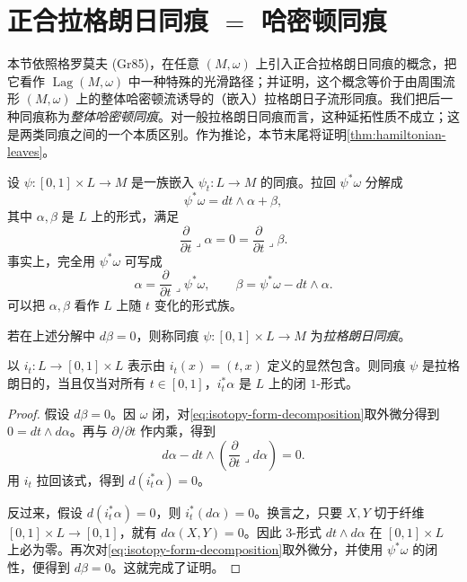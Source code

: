 \section{正合拉格朗日同痕 \texorpdfstring{$=$}{=} 哈密顿同痕}
\label{sec:exact-isotopy-hamiltonian-isotopy}

本节依照格罗莫夫 (Gr85)，在任意 $(M,\omega)$ 上引入正合拉格朗日同痕的概念，把它看作 $\operatorname{Lag}(M,\omega)$ 中一种特殊的光滑路径；并证明，这个概念等价于由周围流形 $(M,\omega)$ 上的整体哈密顿流诱导的（嵌入）拉格朗日子流形同痕。我们把后一种同痕称为\emph{整体哈密顿同痕}。对一般拉格朗日同痕而言，这种延拓性质不成立；这是两类同痕之间的一个本质区别。作为推论，本节末尾将证明\cref{thm:hamiltonian-leaves}。

设 $\psi:[0,1]\times L\to M$ 是一族嵌入 $\psi_t:L\to M$ 的同痕。拉回 $\psi^*\omega$ 分解成
\begin{equation}
 \psi^*\omega=dt\wedge\alpha+\beta,
 \label{eq:isotopy-form-decomposition}
\end{equation}
其中 $\alpha,\beta$ 是 $L$ 上的形式，满足
\[
 \frac\partial{\partial t}\mathbin{\lrcorner}\alpha=0
 =\frac\partial{\partial t}\mathbin{\lrcorner}\beta.
\]
事实上，完全用 $\psi^*\omega$ 可写成
\[
 \alpha=\frac\partial{\partial t}\mathbin{\lrcorner}\psi^*\omega,
 \qquad
 \beta=\psi^*\omega-dt\wedge\alpha.
\]
可以把 $\alpha,\beta$ 看作 $L$ 上随 $t$ 变化的形式族。

\begin{definition}\label{def:lagrangian-isotopy}
若在上述分解中 $d\beta=0$，则称同痕
$\psi:[0,1]\times L\to M$ 为\emph{拉格朗日同痕}。
\end{definition}

\begin{proposition}\label{prop:lagrangian-isotopy-closed-form}
以 $i_t:L\to[0,1]\times L$ 表示由 $i_t(x)=(t,x)$ 定义的显然包含。则同痕 $\psi$ 是拉格朗日的，当且仅当对所有 $t\in[0,1]$，$i_t^*\alpha$ 是 $L$ 上的闭 $1$-形式。
\end{proposition}

\begin{proof}
假设 $d\beta=0$。因 $\omega$ 闭，对\eqref{eq:isotopy-form-decomposition}取外微分得到 $0=dt\wedge d\alpha$。再与 $\partial/\partial t$ 作内乘，得到
\[
 d\alpha-dt\wedge\left(\frac\partial{\partial t}
     \mathbin{\lrcorner}d\alpha\right)=0.
\]
用 $i_t$ 拉回该式，得到 $d(i_t^*\alpha)=0$。

反过来，假设 $d(i_t^*\alpha)=0$，则 $i_t^*(d\alpha)=0$。换言之，只要
$X,Y$ 切于纤维 $[0,1]\times L\to[0,1]$，就有 $d\alpha(X,Y)=0$。因此 $3$-形式 $dt\wedge d\alpha$ 在 $[0,1]\times L$ 上必为零。再次对\eqref{eq:isotopy-form-decomposition}取外微分，并使用 $\psi^*\omega$ 的闭性，便得到 $d\beta=0$。这就完成了证明。
\end{proof}

